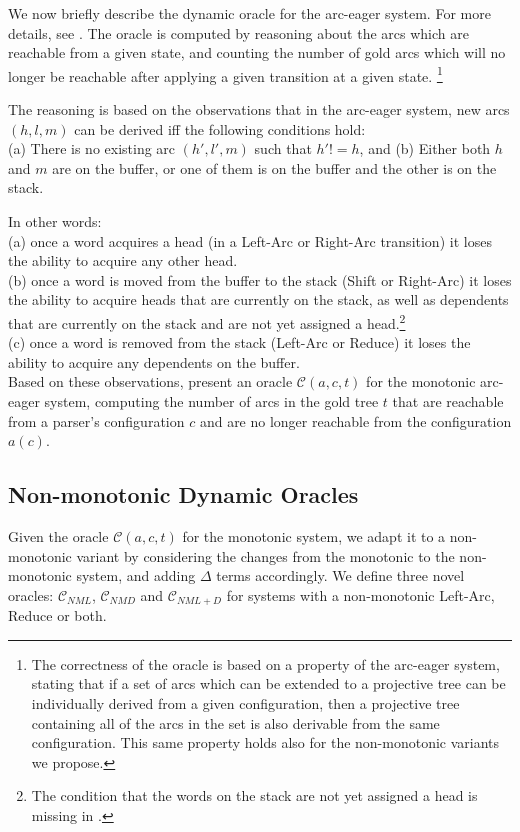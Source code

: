 \documentclass[11pt,letterpaper]{article}
\begin{document}
We now briefly describe the dynamic oracle for the arc-eager system. For more
details, see \citet{goldberg:12}. The oracle is computed by reasoning about the
arcs which are reachable from a given state, and counting the number of gold
arcs which will no longer be reachable after applying a given transition at a
given state.
\footnote{The correctness of
the oracle is based on a property of the arc-eager system, stating that if a
set of arcs which can be extended to a projective tree can be individually
derived from a given configuration, then a projective tree containing all of
the arcs in the set is also derivable from the same configuration. This same
property holds also for the non-monotonic variants we propose.}

The reasoning is based on the observations that in the arc-eager system, new
arcs $(h,l,m)$ can be derived iff the following conditions hold:\\
(a) There is no existing arc $(h',l',m)$ such that $h'!=h$, and 
(b) Either both $h$ and $m$ are on the buffer, or one of them is on the buffer
and the other is on the stack.

\noindent In other words:\\
(a) once a word acquires a head (in a Left-Arc or Right-Arc transition) it loses the ability to acquire
any other head.\\
(b) once a word is moved from the buffer to the stack (Shift or Right-Arc) it loses the ability to
acquire heads that are currently on the stack, as well as dependents that are
currently on the stack and are not yet assigned a head.\footnote{The condition
that the words on the stack are not yet assigned a head is missing in
\citep{goldberg:12}.}\\
(c) once a word is removed from the stack (Left-Arc or Reduce) it loses the
ability to acquire any dependents on the buffer.\\

Based on these observations, \citet{goldberg:12} present an oracle
$\mathcal{C}(a,c,t)$ for the monotonic arc-eager system, computing the number
of arcs in the gold tree $t$ that are reachable from a parser's configuration
$c$ and are no longer reachable from the configuration $a(c)$.

\subsection{Non-monotonic Dynamic Oracles}

Given the oracle $\mathcal{C}(a,c,t)$ for the monotonic system,
we adapt it to a non-monotonic variant by considering the changes from the
monotonic to the non-monotonic system, and adding $\Delta$ terms accordingly.
We define three novel oracles: $\mathcal{C}_{NML}$, $\mathcal{C}_{NMD}$ and
$\mathcal{C}_{NML+D}$ for systems with a non-monotonic Left-Arc, Reduce or both.
\end{document}
